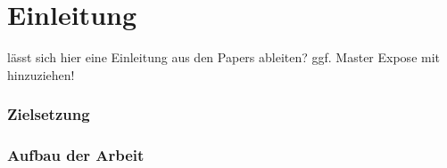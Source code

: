 \chapter{Einleitung}


\begin{neu}
lässt sich hier eine Einleitung aus den Papers ableiten? ggf. Master Expose mit hinzuziehen!
  
\end{neu}
  

\subsection{Zielsetzung}


\subsection{Aufbau der Arbeit}

